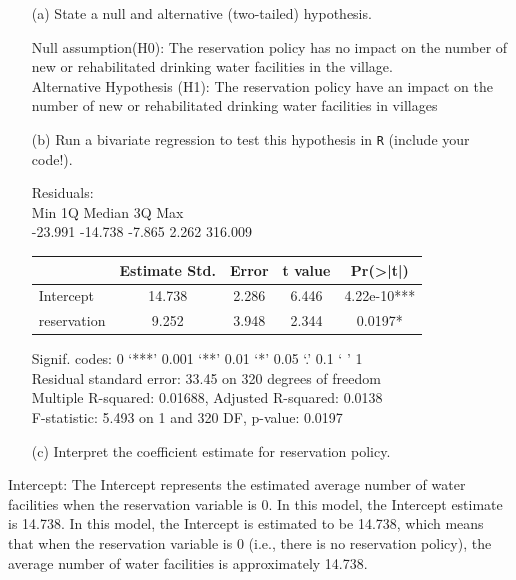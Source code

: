 \documentclass[12pt,letterpaper]{article}
\begin{document}
\newpage
\begin{enumerate}
	\item [(a)] State a null and alternative (two-tailed) hypothesis. 

	Null assumption(H0): The reservation policy has no impact on the number of new or rehabilitated drinking water facilities in the village.\\
	
	Alternative Hypothesis (H1): The reservation policy have an impact on the number of new or rehabilitated drinking water facilities in villages\\
	
	\vspace{6cm}
	\item [(b)] Run a bivariate regression to test this hypothesis in \texttt{R} (include your code!).
	

	
	Residuals:\\
	Min      1Q  Median      3Q     Max \\
	-23.991 -14.738  -7.865   2.262 316.009 \\
		\begin{table}[ht]
		\centering
		\begin{tabular}{l | c c c c}
			\toprule
			& Estimate Std. & Error & t value & Pr(>|t|)\\
			\midrule 
			Intercept & 14.738 & 2.286 & 6.446 &4.22e-10*** \\
			reservation & 9.252 & 3.948 & 2.344 &0.0197* \\
			\bottomrule
		\end{tabular}
	\end{table}
	Signif. codes:  0 ‘***’ 0.001 ‘**’ 0.01 ‘*’ 0.05 ‘.’ 0.1 ‘ ’ 1\\
	Residual standard error: 33.45 on 320 degrees of freedom\\
	Multiple R-squared:  0.01688,	Adjusted R-squared:  0.0138 \\
	F-statistic: 5.493 on 1 and 320 DF,  p-value: 0.0197\\
	
	\vspace{6cm}
	\item [(c)] Interpret the coefficient estimate for reservation policy. 
\end{enumerate}

 Intercept: The Intercept represents the estimated average number of water facilities when the reservation variable is 0. In this model, the Intercept estimate is 14.738. In this model, the Intercept is estimated to be 14.738, which means that when the reservation variable is 0 (i.e., there is no reservation policy), the average number of water facilities is approximately 14.738.\\
 
\end{document}
